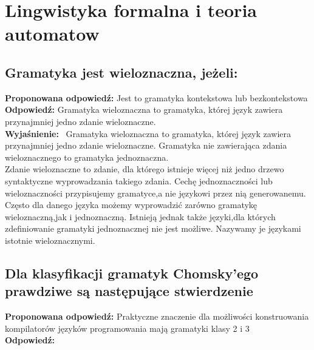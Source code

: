 \chapter{Lingwistyka formalna i teoria automatow}
\PartialToc

\section{Gramatyka jest wieloznaczna, jeżeli:} 

\vspace{0.4cm}
\noindent \textbf{Proponowana odpowiedź:} Jest to gramatyka kontekstowa lub bezkontekstowa \\ 

\noindent \textbf{Odpowiedź:}  Gramatyka wieloznaczna to gramatyka, której język zawiera przynajmniej jedno zdanie wieloznaczne. \\ 

\noindent \textbf{Wyjaśnienie:} \
Gramatyka wieloznaczna to gramatyka, której język zawiera przynajmniej jedno zdanie wieloznaczne. Gramatyka nie zawierająca  zdania wieloznacznego to gramatyka jednoznaczna. \\
Zdanie wieloznaczne to zdanie, dla którego  istnieje więcej niż jedno drzewo syntaktyczne wyprowadzania takiego zdania. Cechę jednoznaczności lub wieloznaczności przypisujemy gramatyce,a nie językowi przez nią generowanemu. Często dla danego języka możemy wyprowadzić zarówno gramatykę wieloznaczną,jak i jednoznaczną. Istnieją jednak także języki,dla których zdefiniowanie gramatyki jednoznacznej nie jest możliwe. Nazywamy je językami istotnie wieloznacznymi.

\section{Dla klasyfikacji gramatyk Chomsky'ego prawdziwe są następujące stwierdzenie} 

\vspace{0.4cm}
\noindent \textbf{Proponowana odpowiedź:} Praktyczne znaczenie dla możliwości konstruowania kompilatorów języków programowania mają gramatyki klasy 2 i 3 \\ 

\noindent \textbf{Odpowiedź:}  \\ 

